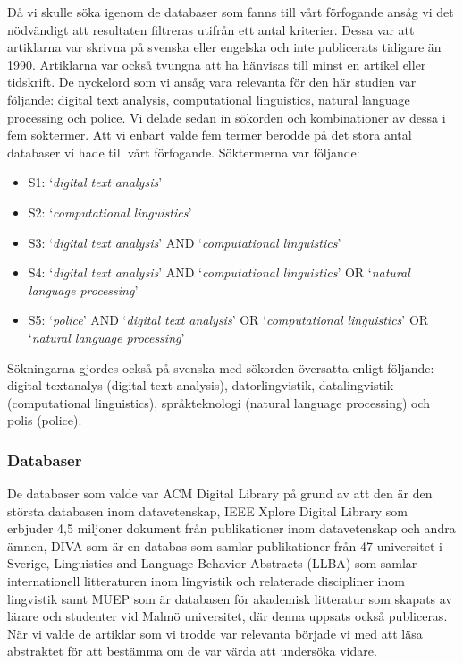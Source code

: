 \documentclass[swedish]{maucsthesis}
\begin{document}
Då vi skulle söka igenom de databaser som fanns till vårt förfogande ansåg vi
det nödvändigt att resultaten filtreras utifrån ett antal kriterier. Dessa var
att artiklarna var skrivna på svenska eller engelska och inte publicerats
tidigare än 1990. Artiklarna var också tvungna att ha hänvisas till minst en
artikel eller tidskrift. De nyckelord som vi ansåg vara relevanta för den här
studien var följande: digital text analysis, computational linguistics, natural
language processing och police. Vi delade sedan in sökorden och kombinationer av
dessa i fem söktermer. Att vi enbart valde fem termer berodde på det stora antal
databaser vi hade till vårt förfogande. Söktermerna var följande:

\begin{itemize}
\item S1: ‘\textit{digital text analysis}’
\item S2: ‘\textit{computational linguistics}’
\item S3: ‘\textit{digital text analysis}’ AND ‘\textit{computational
    linguistics}’
\item S4: ‘\textit{digital text analysis}’ AND ‘\textit{computational
    linguistics}’ OR ‘\textit{natural language processing}’
\item S5: ‘\textit{police}’ AND ‘\textit{digital text analysis}’ OR
  ‘\textit{computational linguistics}’ OR ‘\textit{natural language processing}’
\end{itemize}

Sökningarna gjordes också på svenska med sökorden översatta enligt följande:
digital textanalys (digital text analysis), datorlingvistik, datalingvistik
(computational linguistics), språkteknologi (natural language processing) och
polis (police).

\subsubsection{Databaser}

De databaser som valde var ACM Digital Library på grund av att den är den
största databasen inom datavetenskap, IEEE Xplore Digital Library som erbjuder
4,5 miljoner dokument från publikationer inom datavetenskap och andra ämnen,
DIVA som är en databas som samlar publikationer från 47 universitet i Sverige,
Linguistics and Language Behavior Abstracts (LLBA) som samlar internationell
litteraturen inom lingvistik och relaterade discipliner inom lingvistik samt
MUEP som är databasen för akademisk litteratur som skapats av lärare och
studenter vid Malmö universitet, där denna uppsats också publiceras. När vi
valde de artiklar som vi trodde var relevanta började vi med att läsa abstraktet
för att bestämma om de var värda att undersöka vidare.
\end{document}
